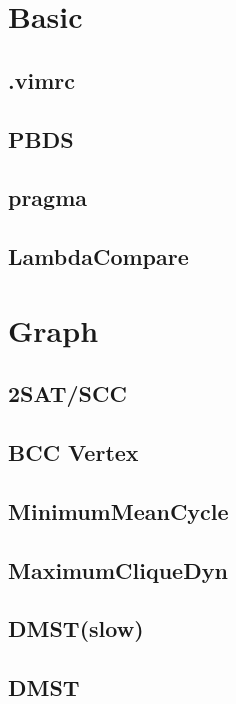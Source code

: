 \section{Basic}
	\subsection{.vimrc}
	
	\subsection{PBDS}
	
	\subsection{pragma}
	
	\subsection{LambdaCompare}
	
\section{Graph}
	\subsection{2SAT/SCC}
	
	\subsection{BCC Vertex}
	
	\subsection{MinimumMeanCycle}
	
	\subsection{MaximumCliqueDyn}
	
	\subsection{DMST(slow)}
	
	\subsection{DMST}
	
